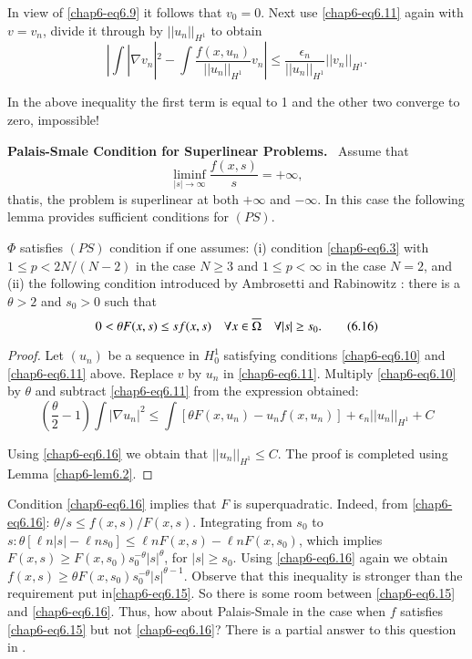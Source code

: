 In view of \eqref{chap6-eq6.9} it follows that $v_{0}=0$. Next use
\eqref{chap6-eq6.11} again with $v=v_{n}$, divide it through by
$||u_{n}||_{H^{1}}$ to obtain
$$
|\int|\nabla v_{n}|^{2}-\int
\frac{f(x,u_{n})}{||u_{n}||_{H^{1}}}v_{n}|\leq
\frac{\epsilon_{n}}{||u_{n}||_{H^{1}}}||v_{n}||_{H^{1}}. 
$$

In the above inequality the first term is equal to 1 and the other two
converge to zero, impossible! 
\medskip

\noindent
{\bf Palais-Smale Condition for Superlinear Problems.}~ Assume that
\begin{equation*}
\mathop{\lim\inf}_{|s|\to
  \infty}\frac{f(x,s)}{s}=+\infty,\tag{6.15}\label{chap6-eq6.15} 
\end{equation*}
that\pageoriginale is, the problem is superlinear at both $+\infty$
and $-\infty$. In this case the following lemma provides sufficient
conditions for $(PS)$.

\begin{lemma}\label{chap6-lem6.4}
$\Phi$ satisfies $(PS)$ condition if one assumes: {\rm(i)} condition
  \eqref{chap6-eq6.3} with $1\leq p<2N/(N-2)$ in the case $N\geq 3$
  and $1\leq p<\infty$ in the case $N=2$, and {\rm(ii)} the following
  condition introduced by Ambrosetti and Rabinowitz \cite{key7}: there
  is a $\theta>2$ and $s_{0}>0$ such that
\begin{equation*}
0<\theta F(x,s)\leq sf(x,s)\quad \forall x\in \overline{\Omega}\quad \forall
|s|\geq s_{0}.\tag{6.16}\label{chap6-eq6.16} 
\end{equation*}
\end{lemma}

\begin{proof}
Let $(u_{n})$ be a sequence in $H^{1}_{0}$ satisfying conditions
\eqref{chap6-eq6.10} and \eqref{chap6-eq6.11} above. Replace $v$ by
$u_{n}$ in \eqref{chap6-eq6.11}. Multiply \eqref{chap6-eq6.10} by
$\theta$ and subtract \eqref{chap6-eq6.11} from the expression
obtained: 
$$
\left(\frac{\theta}{2}-1\right)\int |\nabla u_{n}|^{2}\leq \int
     [\theta F(x,u_{n})-u_{n}f(x,u_{n})]+\epsilon_{n}||u_{n}||_{H^{1}}+C
$$

Using \eqref{chap6-eq6.16} we obtain that $||u_{n}||_{H^{1}}\leq
C$. The proof is completed using Lemma \ref{chap6-lem6.2}.
\end{proof}

\begin{remark*}
Condition \eqref{chap6-eq6.16} implies that $F$ is
superquadratic. Indeed, from \eqref{chap6-eq6.16}: $\theta/s\leq
f(x,s)/F(x,s)$. Integrating from $s_{0}$ to $s:\theta[\ell n|s|-\ell
  ns_{0}]\leq \ell nF(x,s)-\ell nF(x,s_{0})$, which implies
$F(x,s)\geq F(x,s_{0})s^{-\theta}_{0}|s|^{\theta}$, for $|s|\geq
s_{0}$. Using \eqref{chap6-eq6.16} again we obtain $f(x,s)\geq \theta
F(x,s_{0})s^{-\theta}_{0}|s|^{\theta-1}$. Observe that this inequality
is stronger than the requirement put in\break \eqref{chap6-eq6.15}. So there
is some room between \eqref{chap6-eq6.15} and
\eqref{chap6-eq6.16}. Thus, how about Palais-Smale in the case when
$f$ satisfies \eqref{chap6-eq6.15} but not \eqref{chap6-eq6.16}? There
is a partial answer to this question in \cite{key42}.
\end{remark*}

